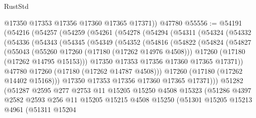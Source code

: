 \begin{lexlean}{RustStd}
\begin{coremodule}
{\begin{coremodule}
{{{{{{{{{{{{{{{{{{{{{{{{{{{{{{{{{{{{{{{{{{{{{{{{{{{{{{{        @17350
        @17353
        @17356
        @17360
        @17365
        @17371))
    @47780
@55556 := @54191
    (@54216
      (@54257
        (@54259
          (@54261
            (@54278
              (@54294
                (@54311
                  (@54324
                    (@54332
                      (@54336
                        (@54343
                          (@54345
                            (@54349
                              (@54352
                                (@54816
                                  (@54822
                                    (@54824
                                      (@54827
                                        (@55043
                                          (@55260 @17260 (@17180 (@17262 @14976 @4508)))
                                          @17260
                                          (@17180 (@17262 @14795 @15153)))
                                        @17350
                                        @17353
                                        @17356
                                        @17360
                                        @17365
                                        @17371))
                                    @47780
                                    @17260
                                    (@17180 (@17262 @14787 @4508)))
                                  @17260
                                  (@17180 (@17262 @14402 @15168)))
                                @17350
                                @17353
                                @17356
                                @17360
                                @17365
                                @17371)))
                          @51282
                          (@51287
                            @2595
                            @277
                            @2753
                            @11
                            @15205
                            @15250
                            @4508
                            @15323
                            (@51286
                              @4397
                              @2582
                              @2593
                              @256
                              @11
                              @15205
                              @15215
                              @4508
                              @15250
                              (@51301
                                @15205
                                @15213
                                @4961
                                (@51311
                                  @15204
}}}}}}}}}}}}}}}}}}}}}}}}}}}}}}}}}}}}}}}}}}}}}}}}}}}}}}}
\end{coremodule}}
\end{coremodule}
\end{lexlean}

